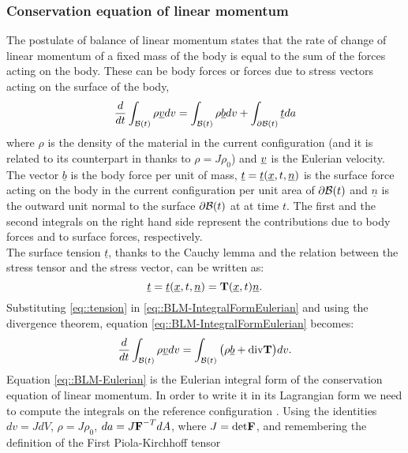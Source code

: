 \subsubsection{Conservation equation of linear momentum}
\label{sct-Conservation} The postulate of balance of linear momentum
states that the rate of change of linear momentum of a fixed mass of
the body is equal to the sum of the forces acting on the body. These
can be body forces or forces due to stress vectors acting on the
surface of the body,
\begin{equation}
  \frac{d}{dt}\int_{\mathcal{B}(t)}\rho\underline{v} dv =
  \int_{\mathcal{B}(t)}\rho\underline{b}
  dv+\int_{\partial\mathcal{B}(t)}\underline{t}da
  \label{eq::BLM-IntegralFormEulerian}
\end{equation}
where $\rho$ is the density of the material in the
current configuration (and it is related to its counterpart in \RefCon
thanks to $\rho=J\rho_0$) and $\underline{v}$ is the Eulerian velocity. The
vector $\underline{b}$ is the body force per unit of mass,
$\underline{t}=\underline{t}(\underline{x},t, \underline{n})$ is the surface
force acting on the body in the current configuration per unit area of
$\partial\mathcal{B}(t)$ and $\underline{n}$ is the outward unit normal to
the surface $\partial\mathcal{B}(t)$ at \npos at time $t$. The first and the
second integrals on the right hand side represent the contributions
due to body forces and to surface forces, respectively.\\ The surface
tension $\underline{t}$, thanks to the Cauchy lemma and the relation
between the stress tensor and the stress vector, can be written as:
\begin{equation}
  \underline{t}=\underline{t}(\underline{x},t,
  \underline{n})=\textbf{T}(\underline{x},t)\underline{n}.
  \label{eq::tension}
\end{equation}
Substituting \eqref{eq::tension} in
\eqref{eq::BLM-IntegralFormEulerian} and using the divergence theorem,
equation \eqref{eq::BLM-IntegralFormEulerian} becomes:
\begin{equation}
  \frac{d}{dt}\int_{\mathcal{B}(t)}\rho\underline{v} dv =
  \int_{\mathcal{B}(t)}\big(\rho\underline{b} +\text{div}\textbf{T} \big)dv.
  \label{eq::BLM-Eulerian}
\end{equation}
Equation \eqref{eq::BLM-Eulerian} is the Eulerian
integral form of the conservation equation of linear momentum. In
order to write it in its Lagrangian form we need to compute the
integrals on the reference configuration \RefCon. Using the identities
$dv=JdV$, $\rho=J\rho_0$, $da=J\textbf{F}^{-T}dA$, where $J=\text{det}\textbf{F}$, and
remembering the definition of the First Piola-Kirchhoff tensor
